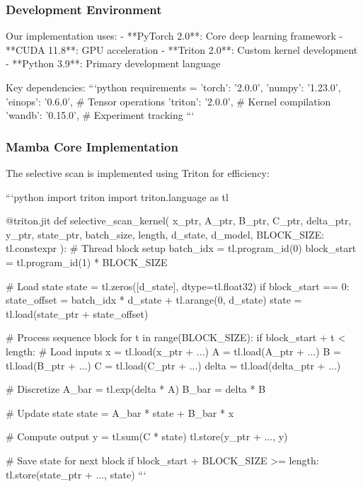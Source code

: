 \documentclass[10pt,journal,compsoc]{IEEEtran}
\begin{document}
\subsubsection{Development Environment}

Our implementation uses:
- **PyTorch 2.0**: Core deep learning framework
- **CUDA 11.8**: GPU acceleration
- **Triton 2.0**: Custom kernel development
- **Python 3.9**: Primary development language

Key dependencies:
```python
requirements = {
    'torch': '2.0.0',
    'numpy': '1.23.0',
    'einops': '0.6.0',  # Tensor operations
    'triton': '2.0.0',  # Kernel compilation
    'wandb': '0.15.0',  # Experiment tracking
}
```

\subsubsection{Mamba Core Implementation}

The selective scan is implemented using Triton for efficiency:

```python
import triton
import triton.language as tl

@triton.jit
def selective_scan_kernel(
    x_ptr, A_ptr, B_ptr, C_ptr, delta_ptr,
    y_ptr, state_ptr,
    batch_size, length, d_state, d_model,
    BLOCK_SIZE: tl.constexpr
):
    # Thread block setup
    batch_idx = tl.program_id(0)
    block_start = tl.program_id(1) * BLOCK_SIZE
    
    # Load state
    state = tl.zeros([d_state], dtype=tl.float32)
    if block_start == 0:
        state_offset = batch_idx * d_state + tl.arange(0, d_state)
        state = tl.load(state_ptr + state_offset)
    
    # Process sequence block
    for t in range(BLOCK_SIZE):
        if block_start + t < length:
            # Load inputs
            x = tl.load(x_ptr + ...)
            A = tl.load(A_ptr + ...)
            B = tl.load(B_ptr + ...)
            C = tl.load(C_ptr + ...)
            delta = tl.load(delta_ptr + ...)
            
            # Discretize
            A_bar = tl.exp(delta * A)
            B_bar = delta * B
            
            # Update state
            state = A_bar * state + B_bar * x
            
            # Compute output
            y = tl.sum(C * state)
            tl.store(y_ptr + ..., y)
    
    # Save state for next block
    if block_start + BLOCK_SIZE >= length:
        tl.store(state_ptr + ..., state)
```
\end{document}
